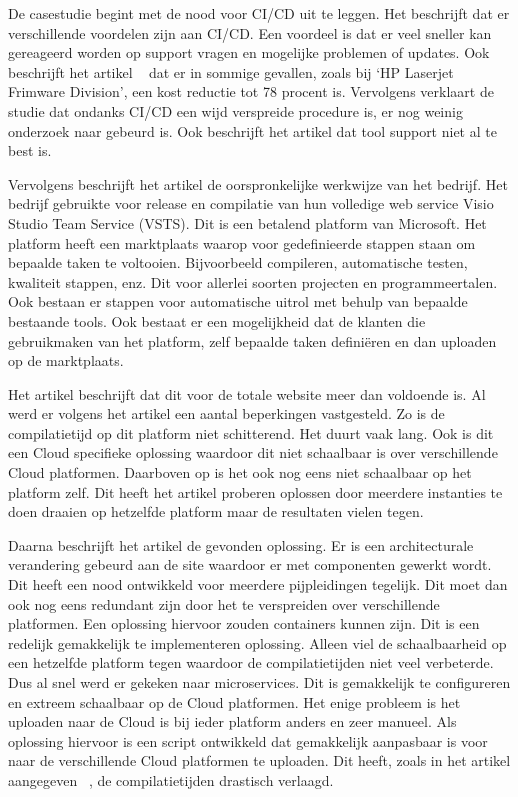 De casestudie \autocite{Debroy2018} begint met de nood voor CI/CD uit te leggen. Het beschrijft dat er verschillende voordelen zijn aan CI/CD. Een voordeel is dat er veel sneller kan gereageerd worden op support vragen en mogelijke problemen of updates. Ook beschrijft het artikel ~\textcite{Debroy2018} dat er in sommige gevallen, zoals bij ‘HP Laserjet Frimware Division’, een kost reductie tot 78 procent is. Vervolgens verklaart de studie dat ondanks CI/CD een wijd verspreide procedure is, er nog weinig onderzoek naar gebeurd is. Ook beschrijft het artikel dat tool support niet al te best is.

Vervolgens beschrijft het artikel \autocite{Debroy2018} de oorspronkelijke werkwijze van het bedrijf. Het bedrijf gebruikte voor release en compilatie van hun volledige web service Visio Studio Team Service (VSTS). Dit is een betalend platform van Microsoft. Het platform heeft een marktplaats waarop voor gedefinieerde stappen staan om bepaalde taken te voltooien. Bijvoorbeeld compileren, automatische testen, kwaliteit stappen, enz. Dit voor allerlei soorten projecten en programmeertalen. Ook bestaan er stappen voor automatische uitrol met behulp van bepaalde bestaande tools. Ook bestaat er een mogelijkheid dat de klanten die gebruikmaken van het platform, zelf bepaalde taken definiëren en dan uploaden op de marktplaats. 

Het artikel \autocite{Debroy2018} beschrijft dat dit voor de totale website meer dan voldoende is. Al werd er volgens het artikel een aantal beperkingen vastgesteld. Zo is de compilatietijd op dit platform niet schitterend. Het duurt vaak lang. Ook is dit een Cloud specifieke oplossing waardoor dit niet schaalbaar is over verschillende Cloud platformen. Daarboven op is het ook nog eens niet schaalbaar op het platform zelf. Dit heeft het artikel proberen oplossen door meerdere instanties te doen draaien op hetzelfde platform maar de resultaten vielen tegen.

Daarna beschrijft het artikel \autocite{Debroy2018} de gevonden oplossing. Er is een architecturale verandering gebeurd aan de site waardoor er met componenten gewerkt wordt. Dit heeft een nood ontwikkeld voor meerdere pijpleidingen tegelijk. Dit moet dan ook nog eens redundant zijn door het te verspreiden over verschillende platformen. Een oplossing hiervoor zouden containers kunnen zijn. Dit is een redelijk gemakkelijk te implementeren oplossing. Alleen viel de schaalbaarheid op een hetzelfde platform tegen waardoor de compilatietijden niet veel verbeterde. Dus al snel werd er gekeken naar microservices. Dit is gemakkelijk te configureren en extreem schaalbaar op de Cloud platformen. Het enige probleem is het uploaden naar de Cloud is bij ieder platform anders en zeer manueel. Als oplossing hiervoor is een script ontwikkeld dat gemakkelijk aanpasbaar is voor naar de verschillende Cloud platformen te uploaden. Dit heeft, zoals in het artikel aangegeven ~\textcite{Debroy2018}, de compilatietijden drastisch verlaagd.

